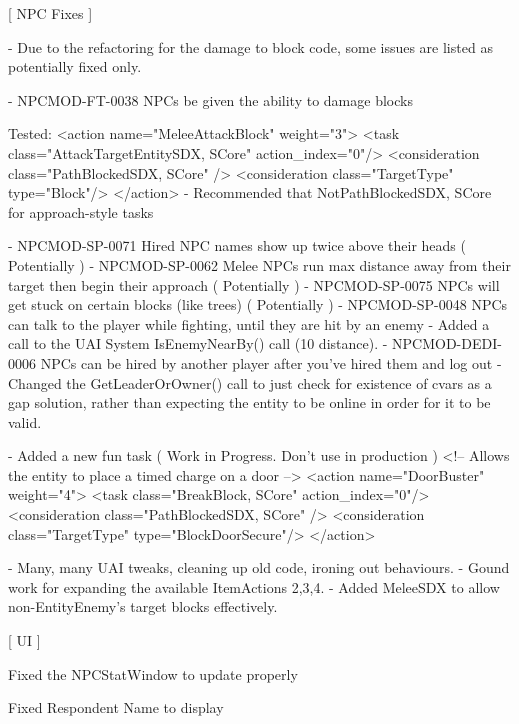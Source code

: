  \mbox{[} NPC Fixes \mbox{]} \begin{DoxyVerb}- Due to the refactoring for the damage to block code, some issues are listed as potentially fixed only.

- NPCMOD-FT-0038        NPCs be given the ability to damage blocks

    Tested:
            <action name="MeleeAttackBlock" weight="3">
                <task class="AttackTargetEntitySDX, SCore" action_index="0"/>
                <consideration class="PathBlockedSDX, SCore"  />
                <consideration class="TargetType" type="Block"/>
            </action>
    - Recommended that NotPathBlockedSDX, SCore for approach-style tasks

- NPCMOD-SP-0071        Hired NPC names show up twice above their heads ( Potentially )
- NPCMOD-SP-0062        Melee NPCs run max distance away from their target then begin their approach ( Potentially )
- NPCMOD-SP-0075        NPCs will get stuck on certain blocks (like trees) ( Potentially )
- NPCMOD-SP-0048        NPCs can talk to the player while fighting, until they are hit by an enemy
    - Added a call to the UAI System IsEnemyNearBy() call (10 distance).
- NPCMOD-DEDI-0006    NPCs can be hired by another player after you've hired them and log out
    - Changed the GetLeaderOrOwner() call to just check for existence of cvars as a gap solution, 
        rather than expecting the entity to be online in order for it to be valid.

- Added a new fun task ( Work in Progress. Don't use in production )
            <!-- Allows the entity to place a timed charge on a door -->
            <action name="DoorBuster" weight="4">
                <task class="BreakBlock, SCore" action_index="0"/>
                <consideration class="PathBlockedSDX, SCore"  />
                <consideration class="TargetType" type="BlockDoorSecure"/>
            </action>

- Many, many UAI tweaks, cleaning up old code, ironing out behaviours.
- Gound work for expanding the available ItemActions 2,3,4.
- Added MeleeSDX to allow non-EntityEnemy's target blocks effectively.
\end{DoxyVerb}
 \mbox{[} UI \mbox{]}
\begin{DoxyItemize}
\item Fixed the NPCStat\+Window to update properly
\item Fixed Respondent Name to display
\end{DoxyItemize}

